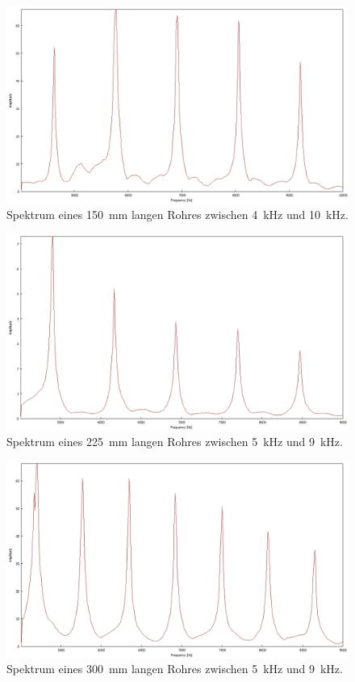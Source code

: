 \begin{figure}
\centering
\includegraphics[width=1\textwidth]{content/messungen/Chapter4/4_1_150mm.jpg}
\caption{Spektrum eines 150~mm langen Rohres zwischen 4~kHz und 10~kHz.}
\label{fig:4_1_150}
\end{figure}

\begin{figure}
\centering
\includegraphics[width=1\textwidth]{content/messungen/Chapter4/4_1_225mm.jpg}
\caption{Spektrum eines 225~mm langen Rohres zwischen 5~kHz und 9~kHz.}
\label{fig:4_1_225}
\end{figure}

\begin{figure}
\centering
\includegraphics[width=1\textwidth]{content/messungen/Chapter4/4_1_300mm.jpg}
\caption{Spektrum eines 300~mm langen Rohres zwischen 5~kHz und 9~kHz.}
\label{fig:4_1_300}
\end{figure}

